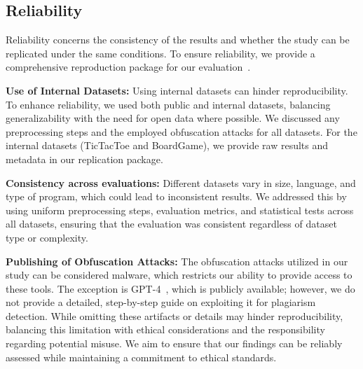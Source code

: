 \subsection{Reliability}
Reliability concerns the consistency of the results and whether the study can be replicated under the same conditions.
To ensure reliability, we provide a comprehensive reproduction package for our evaluation~.

    \textbf{Use of Internal Datasets:} Using internal datasets can hinder reproducibility. To enhance reliability, we used both public and internal datasets, balancing generalizability with the need for open data where possible. We discussed any preprocessing steps and the employed obfuscation attacks for all datasets.
    For the internal datasets (TicTacToe and BoardGame), we provide raw results and metadata in our replication package. 
    
    \textbf{Consistency across evaluations:} Different datasets vary in size, language, and type of program, which could lead to inconsistent results. We addressed this by using uniform preprocessing steps, evaluation metrics, and statistical tests across all datasets, ensuring that the evaluation was consistent regardless of dataset type or complexity.

    \textbf{Publishing of Obfuscation Attacks:}  The obfuscation attacks utilized in our study can be considered malware, which restricts our ability to provide access to these tools. The exception is GPT-4~\cite{gpt4}, which is publicly available; however, we do not provide a detailed, step-by-step guide on exploiting it for plagiarism detection. While omitting these artifacts or details may hinder reproducibility, balancing this limitation with ethical considerations and the responsibility regarding potential misuse. We aim to ensure that our findings can be reliably assessed while maintaining a commitment to ethical standards.

